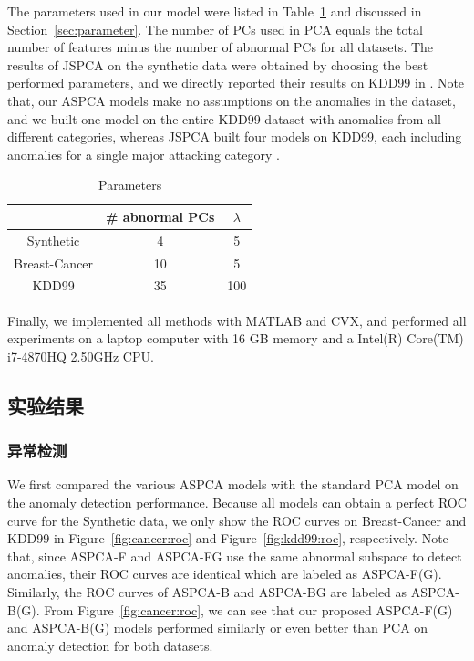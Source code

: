 The parameters used in our model were listed in Table~\ref{table:parameters} and discussed in Section~\ref{sec:parameter}. The number of PCs used in PCA equals the total number of features minus the number of abnormal PCs for all datasets. The results of JSPCA on the synthetic data were obtained by choosing the best performed parameters, and we directly reported their results on KDD99 in \cite{jiang2013family}.   Note that, our ASPCA models make no assumptions on the anomalies in the dataset, and we built one model on the entire KDD99 dataset with anomalies from all different categories, whereas JSPCA built four models on KDD99, each including anomalies for a single major attacking category \cite{jiang2013family}.

\begin{table}
\small
\centering
\caption{Parameters}
\begin{tabular}{|c|c|c|}
\hline
              & \# abnormal PCs & $\lambda$ \\ \hline
Synthetic     & 4               & 5         \\ \hline
Breast-Cancer & 10              & 5         \\ \hline
KDD99        & 35              & 100       \\ \hline
\end{tabular}
    \label{table:parameters}
\end{table}

Finally, we implemented all methods with MATLAB and CVX, and performed all experiments on a laptop computer with 16 GB memory and a Intel(R) Core(TM) i7-4870HQ 2.50GHz CPU.

\subsection{实验结果}

\subsubsection{异常检测}
We first compared the various ASPCA models with the standard PCA model on the anomaly detection performance. Because all models can obtain a perfect ROC
curve for the Synthetic data, we only show the ROC curves on Breast-Cancer and KDD99 in Figure~\ref{fig:cancer:roc} and Figure~\ref{fig:kdd99:roc}, respectively. Note that,
since ASPCA-F and ASPCA-FG use the same abnormal subspace to detect anomalies, their ROC curves are identical which are labeled as ASPCA-F(G). Similarly, the ROC curves of ASPCA-B and ASPCA-BG are labeled as ASPCA-B(G). From Figure~\ref{fig:cancer:roc}, we can see that our proposed ASPCA-F(G) and ASPCA-B(G) models performed similarly or even better than PCA on anomaly detection for both datasets.

